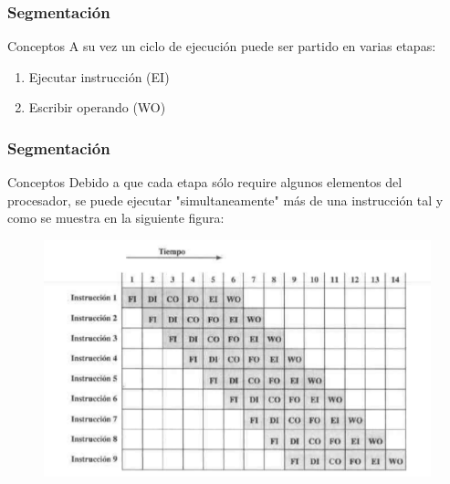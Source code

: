\documentclass{beamer}
\begin{document}
\begin{frame}
	\frametitle{Segmentación}
	\begin{block}{Conceptos}
	A su vez un ciclo de ejecución puede ser partido en varias etapas:
	\begin{enumerate}
		\item Ejecutar instrucción (EI)
		\item Escribir operando (WO)
	\end{enumerate}	
	\end{block}		 		
\end{frame}

\begin{frame}
	\frametitle{Segmentación}
	\begin{block}{Conceptos}
	Debido a que cada etapa sólo require algunos elementos del procesador, se puede ejecutar "simultaneamente" más de una instrucción tal y como se muestra en la siguiente figura:
	\end{block}	
	\begin{figure}[H]
		\centering
		\includegraphics[scale=0.3]{imagenes/segmentacion.png} 
	\end{figure}		 		
\end{frame}
\end{document}
